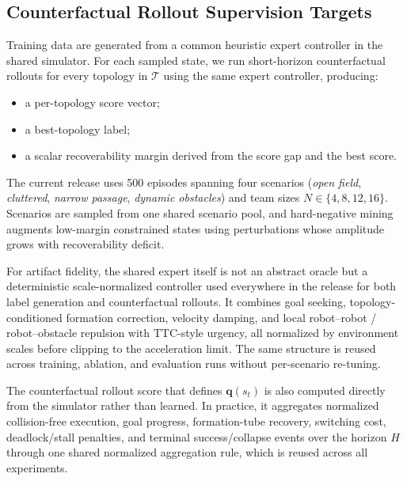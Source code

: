 \documentclass[journal]{IEEEtran}
\newcommand{\cT}{\mathcal{T}}
\begin{document}
\subsection{Counterfactual Rollout Supervision Targets}
Training data are generated from a common heuristic expert controller in
the shared simulator. For each sampled state, we run short-horizon
counterfactual rollouts for every topology in $\cT$ using the same
expert controller, producing:
\begin{itemize}
    \item a per-topology score vector;
    \item a best-topology label;
    \item a scalar recoverability margin derived from the score gap and
    the best score.
\end{itemize}
The current release uses 500 episodes spanning four scenarios
(\emph{open field}, \emph{cluttered}, \emph{narrow passage},
\emph{dynamic obstacles}) and team sizes
$N \in \{4,8,12,16\}$. Scenarios are sampled from one shared scenario
pool, and hard-negative mining augments low-margin constrained states
using perturbations whose amplitude grows with recoverability deficit.

For artifact fidelity, the shared expert itself is not an abstract
oracle but a deterministic scale-normalized controller used everywhere in
the release for both label generation and counterfactual rollouts. It
combines goal seeking, topology-conditioned formation correction,
velocity damping, and local robot--robot / robot--obstacle repulsion
with TTC-style urgency, all normalized by environment scales before
clipping to the acceleration limit. The same structure is reused across
training, ablation, and evaluation runs without per-scenario re-tuning.

The counterfactual rollout score that defines $\mathbf{q}(s_t)$ is also
computed directly from the simulator rather than learned. In practice,
it aggregates normalized collision-free execution, goal progress,
formation-tube recovery, switching cost, deadlock/stall penalties, and
terminal success/collapse events over the horizon $H$ through one shared
normalized aggregation rule, which is reused across all experiments.
\end{document}
